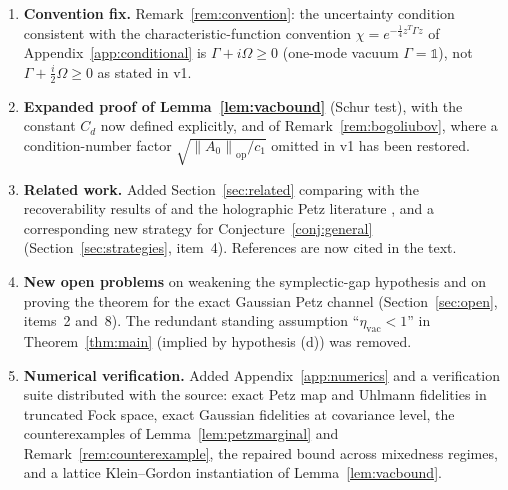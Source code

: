 \documentclass[11pt,a4paper]{article}
\newcommand{\idm}{\mathds{1}}}{\newcommand{\idm}{\mathbf{1}}}
\theoremstyle{plain}
\theoremstyle{definition}
\theoremstyle{remark}
\newcommand{\opnorm}[1]{\left\lVert #1 \right\rVert_{\mathrm{op}}}
\newcommand{\etavac}{\eta_{\mathrm{vac}}}
\begin{document}
\begin{enumerate}
was rewritten accordingly (Lemmas~\ref{lem:bures} and~\ref{lem:comparison}).
\item \textbf{Convention fix.} Remark~\ref{rem:convention}: the uncertainty
condition consistent with the characteristic-function convention
$\chi = e^{-\frac{1}{4}z^T\Gamma z}$ of Appendix~\ref{app:conditional} is
$\Gamma + i\Omega \ge 0$ (one-mode vacuum $\Gamma = \idm$), not
$\Gamma + \tfrac{i}{2}\Omega \ge 0$ as stated in v1.
\item \textbf{Expanded proof of Lemma~\ref{lem:vacbound}} (Schur test), with the
constant $C_d$ now defined explicitly, and of Remark~\ref{rem:bogoliubov}, where
a condition-number factor $\sqrt{\opnorm{A_0}/c_1}$ omitted in v1 has been
restored.
\item \textbf{Related work.} Added Section~\ref{sec:related} comparing with the
recoverability results of \cite{FHSW22,FH22,JungeLaRacuente22} and the
holographic Petz literature \cite{CotlerEtAl19,ChenPS20}, and a corresponding new
strategy for Conjecture~\ref{conj:general} (Section~\ref{sec:strategies},
item~4). References \cite{BW86,NIST,Haag96,Simon94} are now cited in the text.
\item \textbf{New open problems} on weakening the symplectic-gap hypothesis and
on proving the theorem for the exact Gaussian Petz channel
(Section~\ref{sec:open}, items~2 and~8). The redundant standing assumption
``$\etavac < 1$'' in Theorem~\ref{thm:main} (implied by hypothesis (d)) was
removed.
\item \textbf{Numerical verification.} Added Appendix~\ref{app:numerics} and a
verification suite distributed with the source: exact Petz map and Uhlmann
fidelities in truncated Fock space, exact Gaussian fidelities at covariance
level, the counterexamples of Lemma~\ref{lem:petzmarginal} and
Remark~\ref{rem:counterexample}, the repaired bound across mixedness regimes,
and a lattice Klein--Gordon instantiation of Lemma~\ref{lem:vacbound}.
\end{enumerate}
\end{document}
